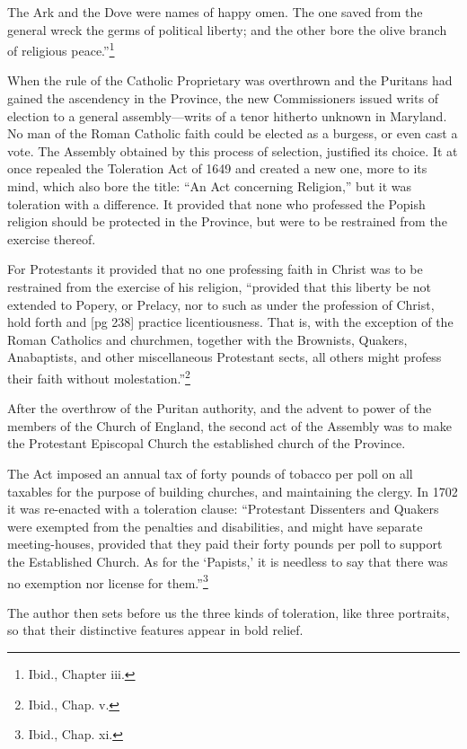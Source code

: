 The Ark and the
Dove were names of happy
omen. The one saved from the general wreck the
germs of political liberty; and the other bore the
olive branch of religious peace.”\footnote{Ibid., Chapter iii.}

When the rule of the Catholic Proprietary was
overthrown and the Puritans had gained the ascendency
in the Province, the new Commissioners
issued writs of election to a general assembly—writs
of a tenor hitherto unknown in Maryland.
No man of the Roman Catholic faith could be
elected as a burgess, or even cast a vote. The Assembly
obtained by this process of selection, justified
its choice. It at once repealed the Toleration
Act of 1649 and created a new one, more to its
mind, which also bore the title: “An Act concerning
Religion,” but it was toleration with a difference.
It provided that none who professed the Popish
religion should be protected in the Province,
but were to be restrained from the exercise thereof.

For Protestants it provided that no one professing
faith in Christ was to be restrained from the
exercise of his religion, “provided that this liberty
be not extended to Popery, or Prelacy, nor to such
as under the profession of Christ, hold forth and
[pg 238]
practice licentiousness. That is, with the exception
of the Roman Catholics and churchmen, together
with the Brownists, Quakers, Anabaptists, and
other miscellaneous Protestant sects, all others
might profess their faith without molestation.”\footnote{Ibid.,
Chap. v.}

After the overthrow of the Puritan authority,
and the advent to power of the members of the
Church of England, the second act of the Assembly
was to make the Protestant Episcopal Church the
established church of the Province.

The Act imposed an annual tax of forty pounds
of tobacco per poll on all taxables for the purpose
of building churches, and maintaining the clergy.
In 1702 it was re-enacted with a toleration clause:
“Protestant Dissenters and Quakers were exempted
from the penalties and disabilities, and might
have separate meeting-houses, provided that they
paid their forty pounds per poll to support the Established
Church. As for the ‘Papists,’ it is needless
to say that there was no exemption nor license
for them.”\footnote{Ibid., Chap. xi.}

The author then sets before us the three kinds of
toleration, like three portraits, so that their distinctive
features appear in bold relief.


